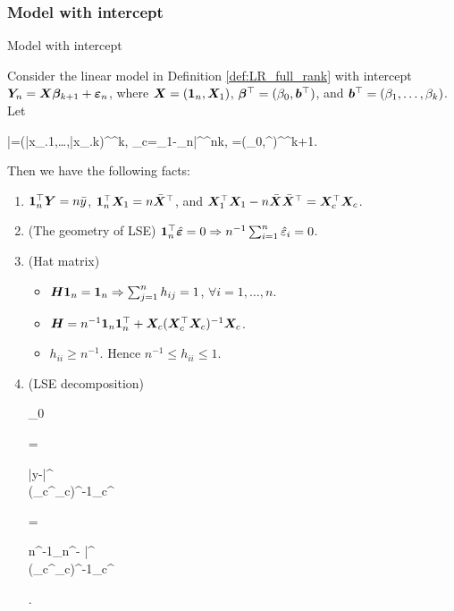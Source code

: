 \documentclass[10pt,a4paper]{book}
\begin{document}
\subsubsection{Model with intercept}\label{sec:LR_full_rank_intercept}
\begin{thmbox}{Model with intercept}
	\begin{proposition}\label{prop:LR_full_rank_intercept}
		Consider the linear model in Definition \ref{def:LR_full_rank} with intercept ${\boldsymbol Y}_{n}={\boldsymbol X}{\boldsymbol\beta}_{k+1}+{\boldsymbol\varepsilon}_n$, where ${\boldsymbol X}=({\boldsymbol 1}_n,{\boldsymbol X}_1)$, ${\boldsymbol\beta}^\top=(\beta_0,{\boldsymbol b}^\top)$, and ${\boldsymbol b}^\top=(\beta_1,\ldots,\beta_k)$.
		Let 
		\begin{sequation*}
			\bar{\X}=(\bar{x}_{.1},\ldots,\bar{x}_{.k})^\TT\in\bbR^k, \quad \X_c=\X_1-\1_n\bar{\X}^\TT\in\bbR^{n\times k}, \quad \hat{\bab}=(\hat{\beta}_0,\hat{\b}^\TT)^\TT\in\bbR^{k+1}.
		\end{sequation*} 
		Then we have the following facts:
		\begin{enumerate}
			\item ${\boldsymbol 1}_n^\top {\boldsymbol Y}=n\bar{y}$, ${\boldsymbol 1}_n^\top {\boldsymbol X}_1=n\bar{{\boldsymbol X}}^\top$, and ${\boldsymbol X}_1^\top{\boldsymbol X}_1-n\bar{{\boldsymbol X}}\bar{{\boldsymbol X}}^\top={\boldsymbol X}_c^\top{\boldsymbol X}_c$. 
			\item (The geometry of LSE)  ${\boldsymbol 1}_n^\top \hat{{\boldsymbol\varepsilon}}=0 \Rightarrow n^{-1}\sum_{i=1}^{n}\hat{\varepsilon}_i=0$.
			\item (Hat matrix) 
			\begin{itemize}
				\item ${\boldsymbol H}{\boldsymbol 1}_n={\boldsymbol 1}_n\Rightarrow \sum_{j=1}^{n}h_{ij}=1$, $\forall i=1,\ldots,n$.
				\item ${\boldsymbol H}=n^{-1}{\boldsymbol 1}_n{\boldsymbol 1}_n^\top+{\boldsymbol X}_c({\boldsymbol X}_c^\top{\boldsymbol X}_c)^{-1}{\boldsymbol X}_c$.
				\item $h_{ii}\geq n^{-1}$. Hence $n^{-1}\leq h_{ii}\leq 1$.   
			\end{itemize}  
			\item (LSE decomposition)
			\begin{sequation*}
				\begin{pmatrix}
					\hat{\beta}_0 \\ \hat{\b}
				\end{pmatrix} = \begin{bmatrix}
					\bar{y}-\bar{\X}^\TT\hat{\b} \\ (\X_c^\TT\X_c)^{-1}\X_c^\TT\Y
				\end{bmatrix} = 
				\begin{bmatrix}
					n^{-1}\1_n^\TT \Y - \bar{\X}^\TT \hat{\b} \\ (\X_c^\TT\X_c)^{-1}\X_c^\TT\Y
				\end{bmatrix}.

\end{sequation*}
\end{enumerate}
\end{proposition}
\end{thmbox}
\end{document}
